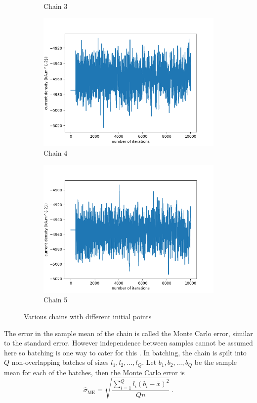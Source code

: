 \documentclass[10pt]{proc}
\newcommand{\dotdotdot}{...}
\begin{document}
\begin{figure}[htp]
\begin{subfigure}[t]{0.49\textwidth}
  \caption{Chain 3}
\end{subfigure}
\begin{subfigure}[t]{0.49\textwidth}
  \includegraphics[width=\textwidth]{chain_4.png}
  \caption{Chain 4}
\end{subfigure}
\begin{subfigure}[t]{0.49\textwidth}
  \includegraphics[width=\textwidth]{chain_5.png}
  \caption{Chain 5}
\end{subfigure}
\caption{Various chains with different initial points}
\label{fig:chains}
\end{figure}

The error in the sample mean of the chain is called the Monte Carlo error, similar to the standard error. However independence between samples cannot be assumed here so batching is one way to cater for this \citep{geyer2011mcmc}. In batching, the chain is spilt into $Q$ non-overlapping batches of sizes $l_1,l_2,\dotdotdot,l_Q$. Let $b_1,b_2,\dotdotdot,b_Q$ be the sample mean for each of the batches, then the Monte Carlo error is
\begin{equation}
\widehat{\sigma}_{\text{ME}}=
\sqrt{
  \dfrac{
    \sum_{i=1}^Ql_i(b_i-\bar{x})^2
  }
  {
    Qn
  }
}
\ .
\end{equation}
\end{document}
